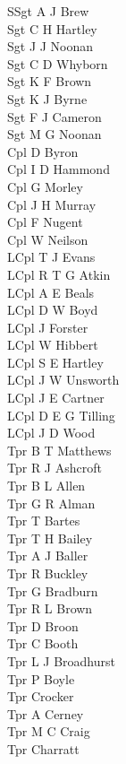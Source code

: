 \begin{multicols}{4}
  \scriptsize
  \noindent
  SSgt A J Brew \\
  Sgt C H Hartley \\
  Sgt J J Noonan \\
  Sgt C D Whyborn \\
  Sgt K F Brown \\
  Sgt K J Byrne \\
  Sgt F J Cameron \\
  Sgt M G Noonan \\
  Cpl D Byron \\
  Cpl I D Hammond \\
  Cpl G Morley \\
  Cpl J H Murray \\
  Cpl F Nugent \\
  Cpl W Neilson \\
  LCpl T J Evans \\
  LCpl R T G Atkin \\
  LCpl A E Beals \\
  LCpl D W Boyd \\
  LCpl J Forster \\
  LCpl W Hibbert \\
  LCpl S E Hartley \\
  LCpl J W Unsworth \\
  LCpl J E Cartner \\
  LCpl D E G Tilling \\
  LCpl J D Wood \\
  Tpr B T Matthews \\
  Tpr R J Ashcroft \\
  Tpr B L Allen \\
  Tpr G R Alman \\
  Tpr T Bartes \\
  Tpr T H Bailey \\
  Tpr A J Baller \\
  Tpr R Buckley \\
  Tpr G Bradburn \\
  Tpr R L Brown \\
  Tpr D Broon \\
  Tpr C Booth \\
  Tpr L J Broadhurst \\
  Tpr P Boyle \\
  Tpr Crocker \\
  Tpr A Cerney \\
  Tpr M C Craig \\
  Tpr Charratt \\

\end{multicols}
